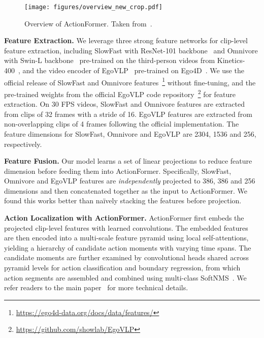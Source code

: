 \documentclass[runningheads]{llncs}
\begin{document}
\begin{figure*}[t!]
	\centering 
	\texttt{[image: figures/overview\_new\_crop.pdf]}\vspace{-0.5em}
	\caption{Overview of ActionFormer. Taken from~\cite{zhang2022actionformer}.}
	\label{fig:overview}\vspace{-1.5em}
\end{figure*}

\noindent \textbf{Feature Extraction.} We leverage three strong feature networks for clip-level feature extraction, including SlowFast with ResNet-101 backbone~\cite{Feichtenhofer_2019_ICCV} and Omnivore with Swin-L backbone~\cite{girdhar2022omnivore} pre-trained on the third-person videos from Kinetics-400~\cite{kay2017kinetics}, and the video encoder of EgoVLP~\cite{kevin2022egovlp} pre-trained on Ego4D~\cite{Ego4D2022CVPR}. We use the official release of SlowFast and Omnivore features~\footnote{\url{https://ego4d-data.org/docs/data/features/}} without fine-tuning, and the pre-trained weights from the official EgoVLP code repository~\footnote{\url{https://github.com/showlab/EgoVLP}} for feature extraction. On 30 FPS videos, SlowFast and Omnivore features are extracted from clips of 32 frames with a stride of 16. EgoVLP features are extracted from non-overlapping clips of 4 frames following the official implementation. The feature dimensions for SlowFast, Omnivore and EgoVLP are 2304, 1536 and 256, respectively.\smallskip

\noindent \textbf{Feature Fusion.} Our model learns a set of linear projections to reduce feature dimension before feeding them into ActionFormer. Specifically, SlowFast, Omnivore and EgoVLP features are \textit{independently} projected to 386, 386 and 256 dimensions and then concatenated together as the input to ActionFormer. We found this works better than na\"ively stacking the features before projection.\smallskip

\noindent \textbf{Action Localization with ActionFormer.} ActionFormer first embeds the projected clip-level features with learned convolutions. The embedded features are then encoded into a multi-scale feature pyramid using local self-attentions, yielding a hierarchy of candidate action moments with varying time spans. The candidate moments are further examined by convolutional heads shared across pyramid levels for action classification and boundary regression, from which action segments are assembled and combined using multi-class SoftNMS~\cite{Bodla_2017_ICCV}. We refer readers to the main paper~\cite{zhang2022actionformer} for more technical details.\smallskip
\end{document}
